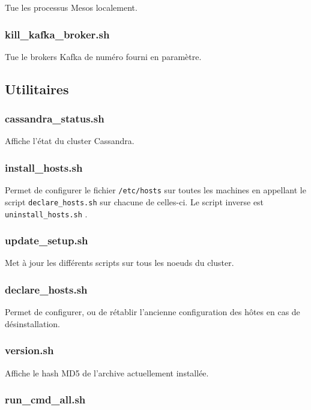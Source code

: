 \documentclass[a4paper, 11pt, titlepage]{article}
\begin{document}
Tue les processus Mesos localement.


\subsubsection*{kill\_kafka\_broker.sh}

Tue le brokers Kafka de numéro fourni en paramètre.



\subsection {Utilitaires}

\subsubsection*{cassandra\_status.sh}

Affiche l'état du cluster Cassandra.


\subsubsection*{install\_hosts.sh}
Permet de configurer le fichier \lstinline!/etc/hosts! sur toutes les machines en appellant le script \lstinline!declare_hosts.sh! sur chacune de celles-ci.
Le script inverse est \lstinline!uninstall_hosts.sh! .


\subsubsection*{update\_setup.sh}

Met à jour les différents scripts sur tous les noeuds du cluster.


\subsubsection*{declare\_hosts.sh}

Permet de configurer, ou de rétablir l'ancienne configuration des hôtes en cas de désinstallation.


\subsubsection*{version.sh}

Affiche le hash MD5 de l'archive actuellement installée.


\subsubsection*{run\_cmd\_all.sh}
\end{document}
